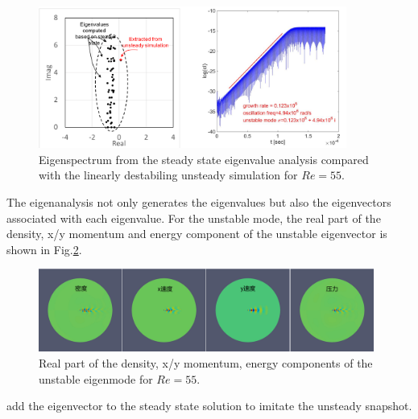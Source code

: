 \documentclass[journal,final]{new-aiaa}
\begin{document}
\begin{figure}[htb]
	\centering   
	\includegraphics[width=0.9\textwidth]{pic/uns-vs-eigen.png}	
	\caption{Eigenspectrum from the steady state eigenvalue analysis
		compared with the linearly destabiling unsteady simulation for $Re=55$.}
	\label{fig:cyl-re55-eigen-vs-uns}
\end{figure}

The eigenanalysis not only generates the eigenvalues but also the eigenvectors
associated with each eigenvalue. For the unstable mode, the real part of the
density, x/y momentum and energy component of the unstable eigenvector
is shown in Fig.\ref{fig:cyl-re55-eigenmode}.
\begin{figure}[htb]
	\centering   
	\includegraphics[width=0.98\textwidth]{pic/eigenmode-real.png}	
	\caption{Real part of the density, x/y momentum, energy components
		of the unstable eigenmode for $Re=55$.}
	\label{fig:cyl-re55-eigenmode}
\end{figure}

{\color{red} add the eigenvector to the steady state solution to imitate the unsteady snapshot.}
\end{document}
